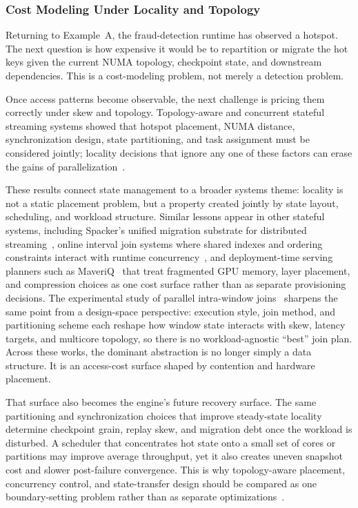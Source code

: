 \documentclass[acmsmall,screen,review]{acmart}
\begin{document}
\subsubsection{Cost Modeling Under Locality and Topology}

Returning to Example~A, the fraud-detection runtime has observed a hotspot. The next question is how expensive it would be to repartition or migrate the hot keys given the current NUMA topology, checkpoint state, and downstream dependencies. This is a cost-modeling problem, not merely a detection problem.

Once access patterns become observable, the next challenge is pricing them correctly under skew and topology. Topology-aware and concurrent stateful streaming systems showed that hotspot placement, NUMA distance, synchronization design, state partitioning, and task assignment must be considered jointly; locality decisions that ignore any one of these factors can erase the gains of parallelization~\cite{zhang2019briskstream,zhang2020concurrent}.

These results connect state management to a broader systems theme: locality is not a static placement problem, but a property created jointly by state layout, scheduling, and workload structure. Similar lessons appear in other stateful systems, including Spacker's unified migration substrate for distributed streaming~\cite{mao2025spacker}, online interval join systems where shared indexes and ordering constraints interact with runtime concurrency~\cite{zhang2023openmldb}, and deployment-time serving planners such as MaveriQ~\cite{liakopoulos2025maveriq} that treat fragmented GPU memory, layer placement, and compression choices as one cost surface rather than as separate provisioning decisions. The experimental study of parallel intra-window joins~\cite{zhang2021intrawindowjoin} sharpens the same point from a design-space perspective: execution style, join method, and partitioning scheme each reshape how window state interacts with skew, latency targets, and multicore topology, so there is no workload-agnostic ``best'' join plan. Across these works, the dominant abstraction is no longer simply a data structure. It is an access-cost surface shaped by contention and hardware placement.

That surface also becomes the engine's future recovery surface. The same partitioning and synchronization choices that improve steady-state locality determine checkpoint grain, replay skew, and migration debt once the workload is disturbed. A scheduler that concentrates hot state onto a small set of cores or partitions may improve average throughput, yet it also creates uneven snapshot cost and slower post-failure convergence. This is why topology-aware placement, concurrency control, and state-transfer design should be compared as one boundary-setting problem rather than as separate optimizations~\cite{zhang2019briskstream,zhang2020concurrent,carbone2015asynchronous,zhao2024recovery,mao2025spacker}.
\end{document}
